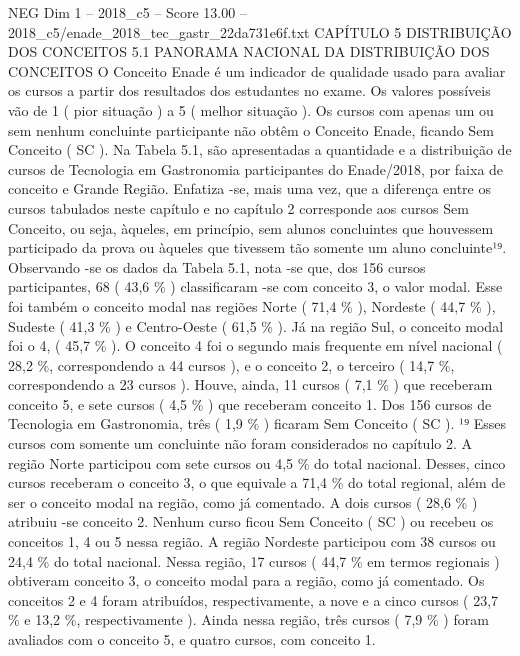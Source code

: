 \begin{textsample}{NEG Dim 1 – 2018\_c5 – Score 13.00 – 2018\_c5/enade\_2018\_tec\_gastr\_22da731e6f.txt}  \label{ex:f1_neg_374}
CAPÍTULO 5 DISTRIBUIÇÃO DOS CONCEITOS 5.1 PANORAMA NACIONAL DA DISTRIBUIÇÃO DOS CONCEITOS O Conceito Enade é um indicador de qualidade usado para avaliar os cursos a partir dos resultados dos estudantes no exame.
Os valores possíveis vão de 1 ( pior situação ) a 5 ( melhor situação ).
Os cursos com apenas um ou sem nenhum concluinte participante não obtêm o Conceito Enade, ficando Sem Conceito ( SC ).
Na Tabela 5.1, são apresentadas a quantidade e a distribuição de cursos de Tecnologia em Gastronomia participantes do Enade/2018, por faixa de conceito e Grande Região.
Enfatiza -se, mais uma vez, que a diferença entre os cursos tabulados neste capítulo e no capítulo 2 corresponde aos cursos Sem Conceito, ou seja, àqueles, em princípio, sem alunos concluintes que houvessem participado da prova ou àqueles que tivessem tão somente um aluno concluinte¹⁹.
Observando -se os dados da Tabela 5.1, nota -se que, dos 156 cursos participantes, 68 ( 43,6 \% ) classificaram -se com conceito 3, o valor modal.
Esse foi também o conceito modal nas regiões Norte ( 71,4 \% ), Nordeste ( 44,7 \% ), Sudeste ( 41,3 \% ) e Centro-Oeste ( 61,5 \% ).
Já na região Sul, o conceito modal foi o 4, ( 45,7 \% ).
O conceito 4 foi o segundo mais frequente em nível nacional ( 28,2 \%, correspondendo a 44 cursos ), e o conceito 2, o terceiro ( 14,7 \%, correspondendo a 23 cursos ).
Houve, ainda, 11 cursos ( 7,1 \% ) que receberam conceito 5, e sete cursos ( 4,5 \% ) que receberam conceito 1.
Dos 156 cursos de Tecnologia em Gastronomia, três ( 1,9 \% ) ficaram Sem Conceito ( SC ). ¹⁹ Esses cursos com somente um concluinte não foram considerados no capítulo 2.
A região Norte participou com sete cursos ou 4,5 \% do total nacional.
Desses, cinco cursos receberam o conceito 3, o que equivale a 71,4 \% do total regional, além de ser o conceito modal na região, como já comentado.
A dois cursos ( 28,6 \% ) atribuiu -se conceito 2.
Nenhum curso ficou Sem Conceito ( SC ) ou recebeu os conceitos 1, 4 ou 5 nessa região.
A região Nordeste participou com 38 cursos ou 24,4 \% do total nacional.
Nessa região, 17 cursos ( 44,7 \% em termos regionais ) obtiveram conceito 3, o conceito modal para a região, como já comentado.
Os conceitos 2 e 4 foram atribuídos, respectivamente, a nove e a cinco cursos ( 23,7 \% e 13,2 \%, respectivamente ).
Ainda nessa região, três cursos ( 7,9 \% ) foram avaliados com o conceito 5, e quatro cursos, com conceito 1.

\end{textsample}
